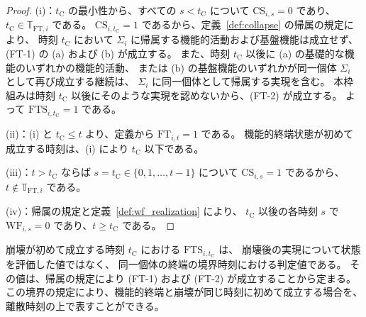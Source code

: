 \begin{proof}
(i)：$t_{\mathrm{C}}$ の最小性から、すべての $s<t_{\mathrm{C}}$ について $\mathrm{CS}_{i,s}=0$ であり、
$t_{\mathrm{C}}\in\mathbb{T}_{\mathrm{FT},i}$ である。
$\mathrm{CS}_{i,t_{\mathrm{C}}}=1$ であるから、定義~\ref{def:collapse} の帰属の規定により、
時刻 $t_{\mathrm{C}}$ において $\Sigma_i$ に帰属する機能的活動および基盤機能は成立せず、
(FT-1) の (a) および (b) が成立する。
また、時刻 $t_{\mathrm{C}}$ 以後に (a) の基礎的な機能のいずれかの機能的活動、
または (b) の基盤機能のいずれかが同一個体 $\Sigma_i$ として再び成立する継続は、
$\Sigma_i$ に同一個体として帰属する実現を含む。
本枠組みは時刻 $t_{\mathrm{C}}$ 以後にそのような実現を認めないから、(FT-2) が成立する。
よって $\mathrm{FTS}_{i,t_{\mathrm{C}}}=1$ である。

(ii)：(i) と $t_{\mathrm{C}}\leq t$ より、定義から $\mathrm{FT}_{i,t}=1$ である。
機能的終端状態が初めて成立する時刻は、(i) により $t_{\mathrm{C}}$ 以下である。

(iii)：$t>t_{\mathrm{C}}$ ならば $s=t_{\mathrm{C}}\in\{0,1,\ldots,t-1\}$ について
$\mathrm{CS}_{i,s}=1$ であるから、$t\notin\mathbb{T}_{\mathrm{FT},i}$ である。

(iv)：帰属の規定と定義~\ref{def:wf_realization} により、
$t_{\mathrm{C}}$ 以後の各時刻 $s$ で $\mathrm{WF}_{i,s}=0$ であり、$t\geq t_{\mathrm{C}}$ である。
\end{proof}

崩壊が初めて成立する時刻 $t_{\mathrm{C}}$ における $\mathrm{FTS}_{i,t_{\mathrm{C}}}$ は、
崩壊後の実現について状態を評価した値ではなく、
同一個体の終端の境界時刻における判定値である。
その値は、帰属の規定により (FT-1) および (FT-2) が成立することから定まる。
この境界の規定により、機能的終端と崩壊が同じ時刻に初めて成立する場合を、
離散時刻の上で表すことができる。

